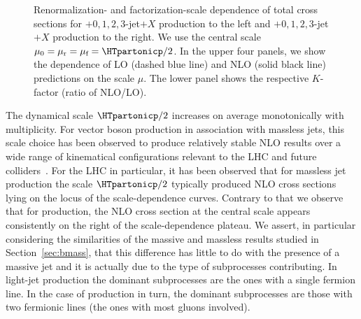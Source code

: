\begin{figure}[t]
\begin{centering}
\end{centering}
\caption{Renormalization- and factorization-scale dependence of total cross
  sections for \Wbbm$+0,1,2,3$-jet$+X$ production to the left and
\Wbbp$+0,1,2,3$-jet$+X$ production to the right. We use the central scale $\mu_0=\mu_{\textrm r}=\mu_{\textrm f}=\HTpartonicp/2$. In the upper four panels, we show the dependence of LO (dashed blue line) and
  NLO (solid black line) predictions on the scale $\mu$. The lower panel shows
  the respective $K$-factor (ratio of NLO/LO).}
\label{fig_Wjets_sdep}
\end{figure}

The dynamical scale $\HTpartonicp/2$ increases on average monotonically with
multiplicity. For vector boson production in association with massless
jets, this scale choice has been observed to produce relatively stable NLO results over a wide range of kinematical
configurations relevant to the LHC and future
colliders~\cite{BH:W3jPRL,BH:W4j,BH:W5j,Mangano:2016jyj}. For the LHC in
particular, it has been observed that for massless jet production the scale
$\HTpartonicp/2$ typically produced NLO cross sections lying on the locus of the
scale-dependence curves. Contrary to that we observe that for \Wbbn{} production, the
NLO cross section at the central scale appears consistently on the right of the
scale-dependence plateau. We assert, in particular considering the
similarities of the massive and massless results studied in
Section~\ref{sec:bmass}, that this difference has little to do with the presence
of a massive jet and it is actually due to the type of
subprocesses contributing. In light-jet production the dominant
subprocesses are the ones with a single fermion line. In the case of
\Wbbn{} production in turn, the dominant subprocesses are those with
two fermionic lines (the ones with most gluons involved).

